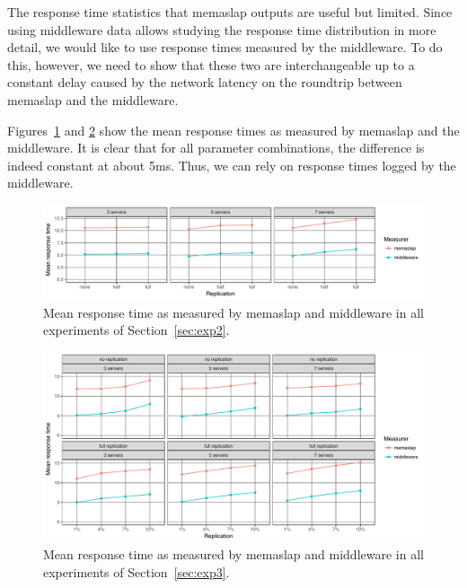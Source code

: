 \documentclass[11pt]{article}
\begin{document}
The response time statistics that memaslap outputs are useful but limited. Since using middleware data allows studying the response time distribution in more detail, we would like to use response times measured by the middleware. To do this, however, we need to show that these two are interchangeable up to a constant delay caused by the network latency on the roundtrip between memaslap and the middleware.

Figures~\ref{fig:appa:comparison:exp2} and \ref{fig:appa:comparison:exp3} show the mean response times as measured by memaslap and the middleware. It is clear that for all parameter combinations, the difference is indeed constant at about 5ms. Thus, we can rely on response times logged by the middleware.

\begin{figure}[h]
\centering
\includegraphics[width=\textwidth]{../results/replication/graphs/compare_mw_ms.pdf}
\caption{Mean response time as measured by memaslap and middleware in all experiments of Section~\ref{sec:exp2}.}
\label{fig:appa:comparison:exp2}
\end{figure}

\begin{figure}[h]
\centering
\includegraphics[width=\textwidth]{../results/writes/graphs/compare_mw_ms.pdf}
\caption{Mean response time as measured by memaslap and middleware in all experiments of Section~\ref{sec:exp3}.}
\label{fig:appa:comparison:exp3}
\end{figure}
\end{document}
